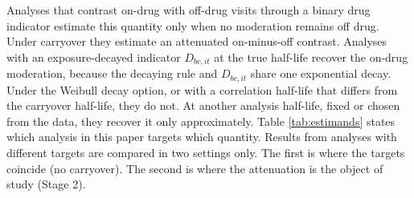 \documentclass[
  11pt,
]{article}
\begin{document}
Analyses that contrast on-drug with off-drug visits through a binary
drug indicator estimate this quantity only when no moderation remains
off drug. Under carryover they estimate an attenuated on-minus-off
contrast. Analyses with an exposure-decayed indicator \(D_{bc,it}\) at
the true half-life recover the on-drug moderation, because the
decaying rule and \(D_{bc,it}\) share one exponential decay. Under
the Weibull decay option, or with a correlation half-life that differs
from the carryover half-life, they do not. At another analysis
half-life, fixed or chosen from the data, they recover it only
approximately. Table \ref{tab:estimands} states which analysis in
this paper targets which quantity. Results from analyses with
different targets are compared in two settings only. The first is
where the targets coincide (no carryover). The second is where the
attenuation is the object of study (Stage 2).
\end{document}
